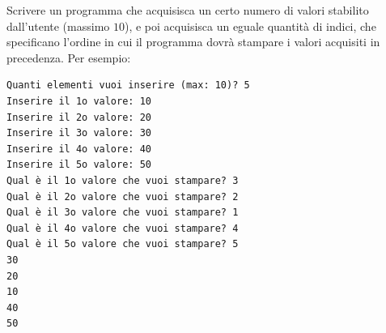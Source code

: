 \begin{Exercise}[label={ex:indici}]
  Scrivere un programma che acquisisca un certo numero di valori stabilito dall'utente (massimo $10$), e poi acquisisca un eguale quantit\`a di indici, che specificano l'ordine in cui il programma dovr\`a stampare i valori acquisiti in precedenza. Per esempio:

\begin{lstlisting}[style=console]
Quanti elementi vuoi inserire (max: 10)? 5
Inserire il 1o valore: 10
Inserire il 2o valore: 20
Inserire il 3o valore: 30
Inserire il 4o valore: 40
Inserire il 5o valore: 50
Qual è il 1o valore che vuoi stampare? 3
Qual è il 2o valore che vuoi stampare? 2
Qual è il 3o valore che vuoi stampare? 1
Qual è il 4o valore che vuoi stampare? 4
Qual è il 5o valore che vuoi stampare? 5
30
20
10
40
50
\end{lstlisting}
\end{Exercise}

\begin{Answer}[ref={ex:indici}]
  
\end{Answer}
